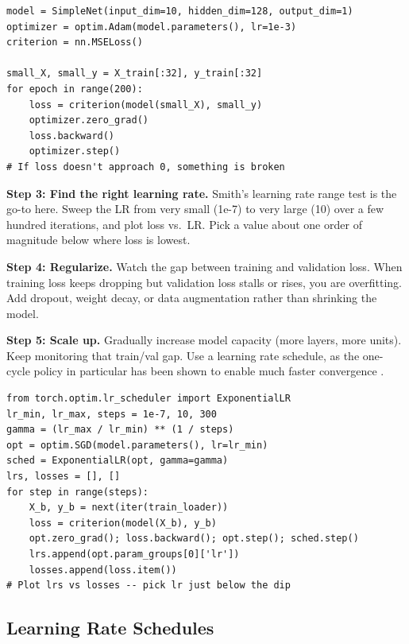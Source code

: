 \documentclass[12pt, letterpaper]{article}
\begin{document}
\noindent\begin{minipage}{\linewidth}
\begin{lstlisting}[caption={Sanity check: can the model memorize a small batch?}]
model = SimpleNet(input_dim=10, hidden_dim=128, output_dim=1)
optimizer = optim.Adam(model.parameters(), lr=1e-3)
criterion = nn.MSELoss()

small_X, small_y = X_train[:32], y_train[:32]
for epoch in range(200):
    loss = criterion(model(small_X), small_y)
    optimizer.zero_grad()
    loss.backward()
    optimizer.step()
# If loss doesn't approach 0, something is broken
\end{lstlisting}
\end{minipage}

\textbf{Step 3: Find the right learning rate.} Smith's learning rate range test \cite{smith2018disciplined} is the go-to here. Sweep the LR from very small (1e-7) to very large (10) over a few hundred iterations, and plot loss vs.\ LR. Pick a value about one order of magnitude below where loss is lowest.

\textbf{Step 4: Regularize.} Watch the gap between training and validation loss. When training loss keeps dropping but validation loss stalls or rises, you are overfitting. Add dropout, weight decay, or data augmentation rather than shrinking the model.

\textbf{Step 5: Scale up.} Gradually increase model capacity (more layers, more units). Keep monitoring that train/val gap. Use a learning rate schedule, as the one-cycle policy in particular has been shown to enable much faster convergence \cite{smith2018disciplined}.

\noindent\begin{minipage}{\linewidth}
\begin{lstlisting}[caption={Learning rate range test}]
from torch.optim.lr_scheduler import ExponentialLR
lr_min, lr_max, steps = 1e-7, 10, 300
gamma = (lr_max / lr_min) ** (1 / steps)
opt = optim.SGD(model.parameters(), lr=lr_min)
sched = ExponentialLR(opt, gamma=gamma)
lrs, losses = [], []
for step in range(steps):
    X_b, y_b = next(iter(train_loader))
    loss = criterion(model(X_b), y_b)
    opt.zero_grad(); loss.backward(); opt.step(); sched.step()
    lrs.append(opt.param_groups[0]['lr'])
    losses.append(loss.item())
# Plot lrs vs losses -- pick lr just below the dip
\end{lstlisting}
\end{minipage}

\subsection{Learning Rate Schedules}
\end{document}
